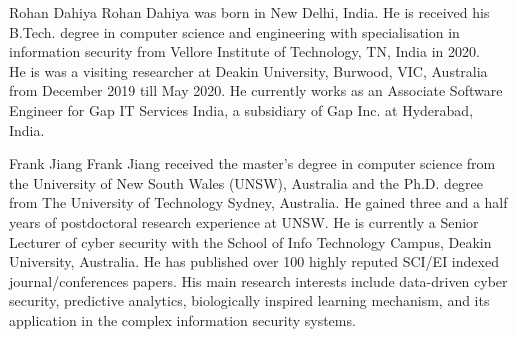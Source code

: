\documentclass[journal]{IEEEtran}
\begin{document}
%

% 
\newpage

\begin{IEEEbiography}{Rohan Dahiya}
Rohan Dahiya was born in New Delhi, India. He is received his B.Tech. degree in computer science and engineering with specialisation in information security from Vellore Institute of Technology, TN, India in 2020. \\ He is was a visiting researcher at Deakin University, Burwood, VIC, Australia from December 2019 till May 2020. He currently works as an Associate Software Engineer for Gap IT Services India, a subsidiary of Gap Inc. at Hyderabad, India. 
\end{IEEEbiography}

\begin{IEEEbiography}{Frank Jiang}
Frank Jiang received the master’s degree in computer science from the University of New South Wales (UNSW), Australia and the Ph.D. degree from The University of Technology Sydney, Australia. He gained three and a half years of postdoctoral research experience at UNSW. He is currently a Senior Lecturer of cyber security with the School of Info Technology Campus, Deakin University, Australia. He has published over 100 highly reputed SCI/EI indexed journal/conferences papers. His main research interests include data-driven cyber security, predictive analytics, biologically inspired learning mechanism, and its application in the complex information security systems.
\end{IEEEbiography}
\end{document}
